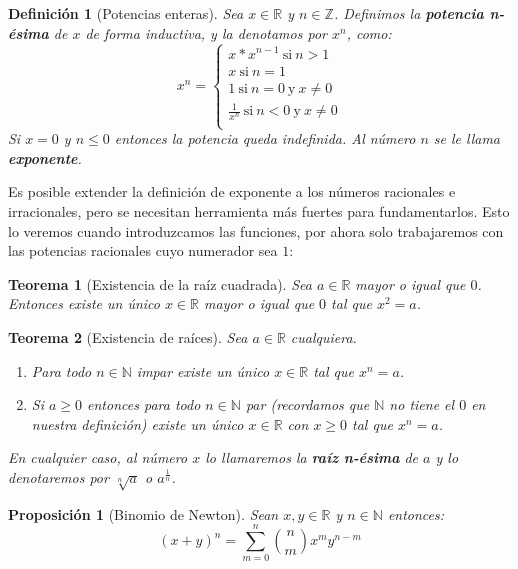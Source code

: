 \documentclass{article}
\newtheorem{theorem}{Teorema}
\newtheorem{prop}{Proposición}
\newtheorem{define}{Definición}
\begin{document}
\begin{define}[Potencias enteras]
Sea $x\in \mathbb{R}$ y $n\in \mathbb{Z}$. Definimos la \textbf{potencia n-ésima} de $x$ de forma inductiva, y la denotamos por $x^n$, como:
\begin{equation}
x^n = \left\lbrace
\begin{array}{l}
x * x^{n-1}\ \text{si}\ n > 1 \\
x\ \text{si}\ n = 1 \\
1\ \text{si}\ n = 0\ \text{y}\ x \neq 0 \\
\frac{1}{x^n}\ \text{si}\ n < 0\ \text{y}\ x \neq 0 \\
\end{array}
\right.
\end{equation}
Si $x = 0$ y $n \leq 0$ entonces la potencia queda indefinida. Al número $n$ se le llama \textbf{exponente}.
\end{define}

Es posible extender la definición de exponente a los números racionales e irracionales, pero se necesitan herramienta más fuertes para fundamentarlos. Esto lo veremos cuando introduzcamos las funciones, por ahora solo trabajaremos con las potencias racionales cuyo numerador sea $1$:

\begin{theorem}[Existencia de la raíz cuadrada]
Sea $a \in \mathbb{R}$ mayor o igual que $0$. Entonces existe un único $x \in \mathbb{R}$ mayor o igual que $0$ tal que $x^2 = a$.
\end{theorem}

\begin{theorem}[Existencia de raíces]
Sea $a \in \mathbb{R}$ cualquiera.
\begin{enumerate}
\item
Para todo $n \in \mathbb{N}$ impar existe un único $x\in \mathbb{R}$ tal que $x^n = a$.
\item
Si $a\geq 0$ entonces para todo $n \in \mathbb{N}$ par (recordamos que $\mathbb{N}$ no tiene el $0$ en nuestra definición) existe un único $x\in \mathbb{R}$ con $x\geq 0$ tal que $x^n = a$.
\end{enumerate}
En cualquier caso, al número $x$ lo llamaremos la \textbf{raíz n-ésima} de $a$ y lo denotaremos por $\sqrt[n]{a}$ o $a^{\frac{1}{n}}$.
\end{theorem}



\begin{prop}[Binomio de Newton]
Sean $x,y \in \mathbb{R}$ y $n \in \mathbb{N}$ entonces:
\begin{equation}
(x + y)^n = \sum_{m=0}^{n} {n \choose m} x^m y^{n-m}
\end{equation}
\end{prop}
\end{document}
